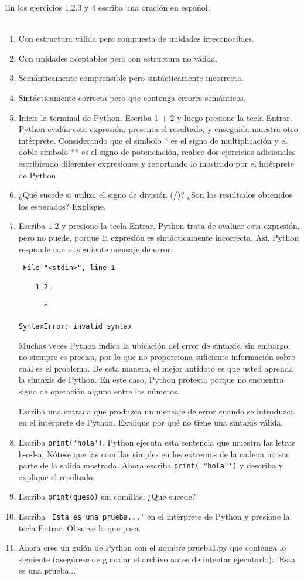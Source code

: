 En los ejercicios 1,2,3 y 4 escriba una oración en español:\\
 \\
\begin{enumerate}
\item Con estructura válida pero compuesta de unidades irreconocibles.
\item Con unidades aceptables pero con estructura no válida.
\item Semánticamente comprensible pero sintácticamente incorrecta.
\item Sintácticamente correcta pero que contenga errores semánticos.
\item Inicie la terminal de Python. Escriba 1 + 2 y luego presione la tecla
Entrar. Python evalúa esta expresión, presenta el resultado, y enseguida
muestra otro intérprete. Considerando que el símbolo {*} es el signo
de multiplicación y el doble símbolo {*}{*} es el signo de potenciación,
realice dos ejercicios adicionales escribiendo diferentes expresiones
y reportando lo mostrado por el intérprete de Python.
\item ¿Qué sucede si utiliza el signo de división (/)? ¿Son los resultados
obtenidos los esperados? Explique.
\item Escriba 1 2 y presione la tecla Entrar. Python trata de evaluar esta
expresión, pero no puede, porque la expresión es sintácticamente incorrecta.
Así, Python responde con el siguiente mensaje de error:

\begin{verbatim}
 File "<stdin>", line 1

    1 2

      ^

SyntaxError: invalid syntax
\end{verbatim}
Muchas veces Python indica la ubicación del error de sintaxis, sin
embargo, no siempre es precisa, por lo que no proporciona suficiente
información sobre cuál es el problema. De esta manera, el mejor antídoto
es que usted aprenda la sintaxis de Python. En este caso, Python protesta
porque no encuentra signo de operación alguno entre los números.

Escriba una entrada que produzca un mensaje de error cuando se introduzca
en el intérprete de Python. Explique por qué no tiene una sintaxis
válida.
\item Escriba \verb+print('hola')+. Python ejecuta esta sentencia que muestra
las letras h-o-l-a. Nótese que las comillas simples en los extremos
de la cadena no son parte de la salida mostrada. Ahora escriba \verb+print('"hola"')+
y describa y explique el resultado.
\item Escriba \verb+print(queso)+ sin comillas. ¿Que sucede?
\item Escriba \verb+'Esta es una prueba...'+ en el intérprete de Python
y presione la tecla Entrar. Observe lo que pasa.
\item Ahora cree un guión de Python con el nombre prueba1.py que contenga
lo siguiente (asegúrese de guardar el archivo antes de intentar ejecutarlo):
'Esta es una prueba...'


\end{enumerate}
